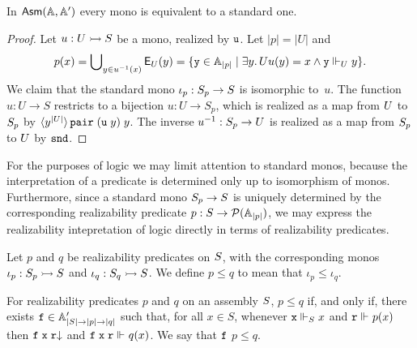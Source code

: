 \begin{proposition}
  In $\AsmA$ every mono is equivalent to a standard one.
\end{proposition}

\begin{proof}
  Let $u : \asm{U} \monoto \asm{S}$ be a mono, realized by $\R{u}$.
  Let $|p| = |U|$ and
  \begin{equation*}
    p(x) = \tbigcup_{y \in \inv{u}(x)} \Ex_U(y) =
    \set{\R{y} \in \Atyp{|p|} \such \some{y}{U}{u(y) = x \land \R{y} \rz[U] y}}.
  \end{equation*}
  We claim that the standard mono $\iota_p : \asm{S}_p \to \asm{S}$ is
  isomorphic to~$u$. The function $u : U \to S$ restricts to a
  bijection $u : U \to S_p$, which is realized as a map from $\asm{U}$
  to $\asm{S}_p$ by
  $\tpcalam{y}{|U|} \combPair\;(\R{u}\;y)\;y$. The inverse
  $\inv{u} : S_p \to U$ is realized as a map from $\asm{S}_p$ to
  $\asm{U}$ by $\combSnd$.
\end{proof}

For the purposes of logic we may limit attention to standard monos,
because the interpretation of a predicate is determined only up to
isomorphism of monos. Furthermore, since a standard mono $\asm{S}_p
\to \asm{S}$ is uniquely determined by the corresponding realizability
predicate $p : S \to \pow{\Atyp{|p|}}$, we may express the
realizability intepretation of logic directly in terms of
realizability predicates.

Let $p$ and $q$ be realizability predicates on $\asm{S}$, with the
corresponding monos $\iota_p : \asm{S}_p \monoto \asm{S}$ and $\iota_q
: \asm{S}_q \monoto \asm{S}$. We define $p \leq q$ to mean that
$\iota_p \leq \iota_q$.

\begin{lemma}
  \label{lemma:realizability-predicate-leq}%
  For realizability predicates $p$ and $q$ on an assembly $\asm{S}$,
  $p \leq q$ if, and only if, there exists $\R{f} \in \subAtyp{|S|
    \to |p| \to |q|}$ such that, for all $x \in S$, whenever $\R{x}
  \rz[S] x$ and $\R{r} \rz p(x)$ then $\defined{\R{f}\;\R{x}\;\R{r}}$
  and $\R{f}\;\R{x}\;\R{r} \rz q(x)$. We say that $\R{f}$
   $p \leq q$.
\end{lemma}

